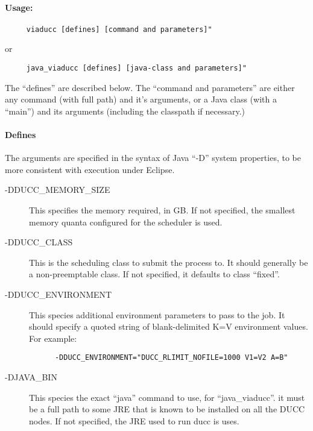     \paragraph{Usage:}
\begin{verbatim}
     viaducc [defines] [command and parameters]"
\end{verbatim}
     or
\begin{verbatim}
     java_viaducc [defines] [java-class and parameters]"
\end{verbatim}

     The ``defines'' are described below.  The ``command and parameters'' are either any command
     (with full path) and it's arguments, or a Java class (with a ``main'') and its arguments (including
     the classpath if necessary.)

     \paragraph{Defines}

     The arguments are specified in the syntax of Java ``-D'' system properties, to be more consistent
     with execution under Eclipse.
     \begin{description}
         \item[-DDUCC\_MEMORY\_SIZE] This specifies the memory required, in GB.  If not specified, the
           smallest memory quanta configured for the scheduler is used.
         \item[-DDUCC\_CLASS] This is the scheduling class to submit the process to.  It should generally
           be a non-preemptable class.  If not specified, it defaults to class ``fixed''.
         \item[-DDUCC\_ENVIRONMENT] This species additional environment parameters to pass to the job.
           It should specify a quoted string of blank-delimited K=V environment values.  For example:
\begin{verbatim}
      -DDUCC_ENVIRONMENT="DUCC_RLIMIT_NOFILE=1000 V1=V2 A=B"
\end{verbatim}
         \item[-DJAVA\_BIN] This species the exact ``java'' command to use, for ``java\_viaducc''.  it
           must be a full path to some JRE that is known to be installed on all the DUCC nodes.  If not
           specified, the JRE used to run ducc is uses.
    \end{description}
        
